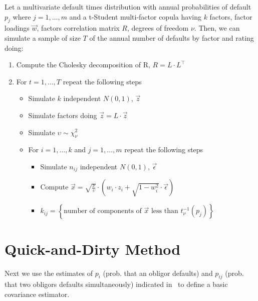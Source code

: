 \documentclass[11pt,fleqn]{book} %
\begin{document}
\begin{algorithm}
	\label{alg:snod}
	Let a multivariate default times distribution with annual probabilities of
	default $p_j$ where $j=1,\dots,m$ and a t-Student multi-factor copula having
	$k$ factors, factor loadings $\vec{w}$, factors correlation matrix $R$, 
	degrees of freedom $\nu$. Then, we can simulate a sample of size $T$ of the 
	annual number of defaults by factor and rating doing:
	\begin{enumerate}
		\item Compute the Cholesky decomposition of R, $R = L \cdot L^\intercal$
		\item For $t=1,\dots,T$ repeat the following steps
		\begin{itemize}
			\item Simulate $k$ independent $N(0,1)$, $\vec{z}$
			\item Simulate factors doing $\vec{z} = L \cdot \vec{z}$
			\item Simulate $\upsilon \sim \chi_{\nu}^2$
			\item For $i=1,\dots,k$ and $j=1,\dots,m$ repeat the following steps
			\begin{itemize}
				\item Simulate $n_{ij}$ independent $N(0,1)$, $\vec{\epsilon}$
				\item Compute $\vec{x} = \sqrt{\frac{\nu}{\upsilon}} \cdot \left( w_i \cdot z_i + \sqrt{1-w_i^2} \cdot \vec{\epsilon} \right)$
				\item $k_{ij} = \left\{ \text{number of components of $\vec{x}$ less than $t_{\nu}^{-1}(p_j)$} \right\} $
			\end{itemize}
		\end{itemize}
	\end{enumerate}
\end{algorithm}

\section{Quick-and-Dirty Method}

Next we use the estimates of $p_i$ (prob. that an obligor defaults)
and $p_{ij}$ (prob. that two obligors defaults simultaneously) indicated 
in~\cite{nagpal:2001} to define a basic covariance estimator. 
\end{document}
